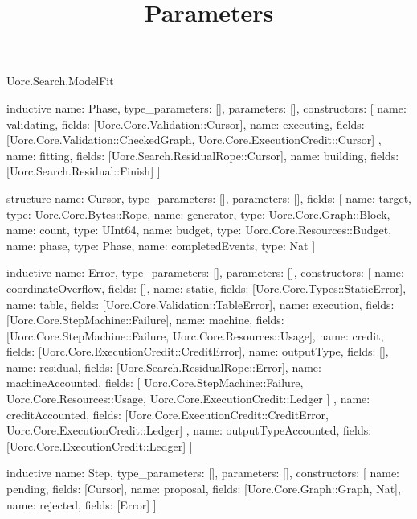 \begin{lexlean}{Uorc.Search.ModelFit}
\title{Parameters}
\begin{semanticmodule}
inductive{
  name: Phase,
  type_parameters: [],
  parameters: [],
  constructors: [
    {name: validating, fields: [Uorc.Core.Validation::Cursor]},
    {
      name: executing,
      fields: [Uorc.Core.Validation::CheckedGraph, Uorc.Core.ExecutionCredit::Cursor]
    },
    {name: fitting, fields: [Uorc.Search.ResidualRope::Cursor]},
    {name: building, fields: [Uorc.Search.Residual::Finish]}
  ]
}

structure{
  name: Cursor,
  type_parameters: [],
  parameters: [],
  fields: [
    {name: target, type: Uorc.Core.Bytes::Rope},
    {name: generator, type: Uorc.Core.Graph::Block},
    {name: count, type: UInt64},
    {name: budget, type: Uorc.Core.Resources::Budget},
    {name: phase, type: Phase},
    {name: completedEvents, type: Nat}
  ]
}

inductive{
  name: Error,
  type_parameters: [],
  parameters: [],
  constructors: [
    {name: coordinateOverflow, fields: []},
    {name: static, fields: [Uorc.Core.Types::StaticError]},
    {name: table, fields: [Uorc.Core.Validation::TableError]},
    {name: execution, fields: [Uorc.Core.StepMachine::Failure]},
    {name: machine, fields: [Uorc.Core.StepMachine::Failure, Uorc.Core.Resources::Usage]},
    {name: credit, fields: [Uorc.Core.ExecutionCredit::CreditError]},
    {name: outputType, fields: []},
    {name: residual, fields: [Uorc.Search.ResidualRope::Error]},
    {
      name: machineAccounted,
      fields: [
        Uorc.Core.StepMachine::Failure,
        Uorc.Core.Resources::Usage,
        Uorc.Core.ExecutionCredit::Ledger
      ]
    },
    {
      name: creditAccounted,
      fields: [Uorc.Core.ExecutionCredit::CreditError, Uorc.Core.ExecutionCredit::Ledger]
    },
    {name: outputTypeAccounted, fields: [Uorc.Core.ExecutionCredit::Ledger]}
  ]
}

inductive{
  name: Step,
  type_parameters: [],
  parameters: [],
  constructors: [
    {name: pending, fields: [Cursor]},
    {name: proposal, fields: [Uorc.Core.Graph::Graph, Nat]},
    {name: rejected, fields: [Error]}
  ]
}


\end{semanticmodule}
\end{lexlean}
